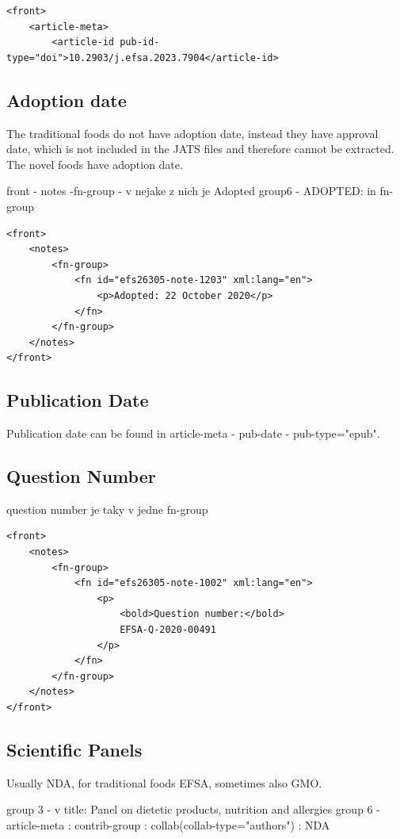 \documentclass[12pt]{article}
\begin{document}
\lstset{language=XML, basicstyle=\footnotesize}
\begin{lstlisting}
<front>
    <article-meta>
        <article-id pub-id-type="doi">10.2903/j.efsa.2023.7904</article-id>
\end{lstlisting}

\subsection{Adoption date}
The traditional foods do not have adoption date, instead they have approval date, which is not included in the JATS files and therefore
cannot be extracted. The novel foods have adoption date.


front - notes -fn-group - v nejake z nich je Adopted
group6 - ADOPTED: in fn-group 
\lstset{language=XML, basicstyle=\footnotesize}
\begin{lstlisting}
<front>
    <notes>
        <fn-group>
            <fn id="efs26305-note-1203" xml:lang="en">
                <p>Adopted: 22 October 2020</p>
            </fn>
        </fn-group>
    </notes>
</front>
\end{lstlisting}

\subsection{Publication Date}
Publication date can be found in article-meta - pub-date - pub-type="epub".

\subsection{Question Number}

question number je taky v jedne fn-group

\lstset{language=XML}
\begin{lstlisting}
<front>
    <notes>
        <fn-group>
            <fn id="efs26305-note-1002" xml:lang="en">
                <p>
                    <bold>Question number:</bold>
                    EFSA-Q-2020-00491
                </p>
            </fn>
        </fn-group>
    </notes>
</front>
\end{lstlisting}

\subsection{Scientific Panels}
Usually NDA, for traditional foods EFSA, sometimes also GMO.


group 3 - v title: Panel on dietetic products, nutrition and allergies
group 6 - article-meta : contrib-group : collab(collab-type="authors") : NDA
\end{document}
